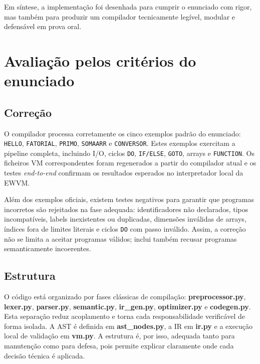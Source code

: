 \documentclass{article}
\begin{document}
Em síntese, a implementação foi desenhada para cumprir o enunciado com rigor, mas também para
produzir um compilador tecnicamente legível, modular e defensável em prova oral.

\section{Avaliação pelos critérios do enunciado}

\subsection{Correção}

O compilador processa corretamente os cinco exemplos padrão do enunciado:
\texttt{HELLO}, \texttt{FATORIAL}, \texttt{PRIMO}, \texttt{SOMAARR} e
\texttt{CONVERSOR}. Estes exemplos exercitam a pipeline completa, incluindo I/O, ciclos
\texttt{DO}, \texttt{IF/ELSE}, \texttt{GOTO}, arrays e \texttt{FUNCTION}. Os ficheiros VM
correspondentes foram regenerados a partir do compilador atual e os testes
\textit{end-to-end} confirmam os resultados esperados no interpretador local da EWVM.

Além dos exemplos oficiais, existem testes negativos para garantir que programas incorretos
são rejeitados na fase adequada: identificadores não declarados, tipos incompatíveis, labels
inexistentes ou duplicadas, dimensões inválidas de arrays, índices fora de limites literais e
ciclos \texttt{DO} com passo inválido. Assim, a correção não se limita a aceitar programas
válidos; inclui também recusar programas semanticamente incoerentes.

\subsection{Estrutura}

O código está organizado por fases clássicas de compilação: \textbf{preprocessor.py},
\textbf{lexer.py}, \textbf{parser.py}, \textbf{semantic.py}, \textbf{ir\_gen.py},
\textbf{optimizer.py} e \textbf{codegen.py}. Esta separação reduz acoplamento e torna cada
responsabilidade verificável de forma isolada. A AST é definida em \textbf{ast\_nodes.py}, a
IR em \textbf{ir.py} e a execução local de validação em \textbf{vm.py}. A estrutura é, por
isso, adequada tanto para manutenção como para defesa, pois permite explicar claramente onde
cada decisão técnica é aplicada.
\end{document}
